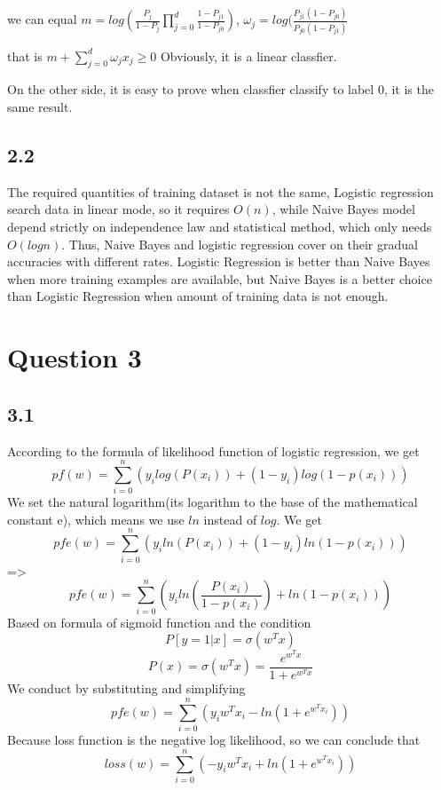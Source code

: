 \documentclass[a4paper,12pt]{article}
\begin{document}
we can equal $m = log (\frac{P_j} {1-P_j} \prod\limits_{j=0}^d  \frac{1-P_{j1}}{1-P_{j0}} ) $,
$\omega_j = log {(\frac{  P_{j1} (1 - P_{j0})  }
{  P_{j0} (1-P_{j1}) } }  $

that is 
$m + \sum\limits_{j=0}^d \omega_j x_j \geq 0$
Obviously, it is a linear classfier.

On the other side, it is easy to prove when classfier classify to label 0, it is the same result.


\subsection*{2.2}
The required quantities of training dataset is not the same, Logistic regression search data in linear mode, so it requires $O(n)$, while Naive Bayes model depend strictly on independence law and statistical method, which only needs $O(logn)$. Thus, Naive Bayes and logistic regression cover on their gradual accuracies with different rates. Logistic Regression is better than Naive Bayes when more training examples are available, but Naive Bayes is a better choice than Logistic Regression when amount of training data is not enough.

\newpage

\section*{Question 3}
\subsection*{3.1}

According to the formula of likelihood function of logistic regression, we get\\
$$pf(w) = \sum\limits_{i=0}^n ( y_i log(P(x_i)) + (1 - y_i)log(1-p(x_i)) ) $$
We set the natural logarithm(its logarithm to the base of the mathematical constant e), which means we use $ln$ instead of $log$. We get
$$pfe(w) = \sum\limits_{i=0}^n ( y_i ln(P(x_i)) + (1 - y_i)ln(1-p(x_i)) ) $$
=>
$$pfe(w) = \sum\limits_{i=0}^n ( y_i ln(\frac{P(x_i)}{1-p(x_i)}) + ln(1-p(x_i)) ) $$
Based on formula of sigmoid function and the condition 
$$P[y = 1 | x] = \sigma(w^T x)$$
$$ P(x) = \sigma(w^T x) = \frac{e^{w^T x}}{1 + e^{w^T x}}$$
We conduct by substituting and simplifying
$$pfe(w) = \sum\limits_{i=0}^n (y_i w^T x_i - ln(1 + e^{w^T x_i}))$$
Because loss function is the negative log likelihood, so we can conclude that
$$loss(w) = \sum\limits_{i=0}^n (- y_i w^T x_i + ln(1 + e^{w^T x_i})) $$
\end{document}

